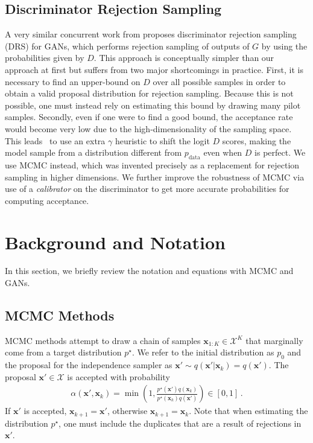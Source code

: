 \documentclass{article}
\renewcommand{\vec}[1]{{\boldsymbol{\mathbf{#1}}}} %
\newcommand{\set}[1]{\mathcal{#1}}
\newcommand{\sample}{\sim}
\newcommand{\given}{|}
\newcommand{\target}{{p^\star}}
\newcommand{\prop}{q}
\newcommand{\pinit}{{p_0}}
\newcommand{\PR}{{p_{\textrm{data}}}}
\newcommand{\accept}{\alpha}
\newcommand{\setx}{\set{X}}
\begin{document}
\subsection{Discriminator Rejection Sampling}
A very similar concurrent work from \citet{Azadi2018} proposes discriminator rejection sampling (DRS) for GANs, which performs rejection sampling of outputs of $G$ by using the probabilities given by $D$.
This approach is conceptually simpler than our approach at first but suffers from two major shortcomings in practice.
First, it is necessary to find an upper-bound on $D$ over all possible samples in order to obtain a valid proposal distribution for rejection sampling.
Because this is not possible, one must instead rely on estimating this bound by drawing many pilot samples.
Secondly, even if one were to find a good bound, the acceptance rate would become very low due to the high-dimensionality of the sampling space.
This leads~\citet{Azadi2018} to use an extra $\gamma$ heuristic to shift the logit $D$ scores, making the model sample from a distribution different from $\PR$ even when $D$ is perfect.
We use MCMC instead, which was invented precisely as a replacement for rejection sampling in higher dimensions.
We further improve the robustness of MCMC via use of a \emph{calibrator} on the discriminator to get more accurate probabilities for computing acceptance.  %

\section{Background and Notation}
\label{sec:Background}

In this section, we briefly review the notation and equations with MCMC and GANs.

\subsection{MCMC Methods}
\label{sec:MCMC Methods}

MCMC methods attempt to draw a chain of samples $\vec x_{1:K} \in \setx^K$ that marginally come from a target distribution $\target$.
We refer to the initial distribution as $\pinit$ and the proposal for the independence sampler as $\vec x' \sample \prop(\vec x' \given \vec x_k)=\prop(\vec x')$.
The proposal $\vec x' \in \setx$ is accepted with probability
\begin{align}
  \accept(\vec x', \vec x_k) = \min\left(1, \frac{\target(\vec x')\prop(\vec x_k)}{\target(\vec x_k)\prop(\vec x')}\right) \in [0,1]\,. \label{eq:alpha def}
\end{align}
If $\vec x'$ is accepted, $\vec x_{k+1} = \vec x'$, otherwise $\vec x_{k+1} = \vec x_k$.
Note that when estimating the distribution $\target$, one must include the duplicates that are a result of rejections in $\vec x'$.
\end{document}
